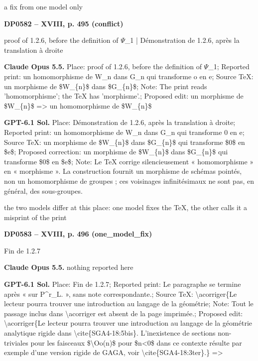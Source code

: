 a fix from one model only\par
\par\noindent\hypertarget{DP0582}{}\textbf{DP0582 -- XVIII, p. 495 (conflict)}\par
proof of 1.2.6, before the definition of \ensuremath{\Psi}\_1 | Démonstration de 1.2.6, après la translation à droite\par
\textbf{Claude Opus 5.5.} Place: proof of 1.2.6, before the definition of \ensuremath{\Psi}\_1; Reported print: un homomorphisme de W\_n dans G\_n qui transforme o en e; Source TeX: un morphisme de \$W\_\{n\}\$ dans \$G\_\{n\}\$; Note: The print reads 'homomorphisme'; the TeX has 'morphisme'.; Proposed edit: un morphisme de \$W\_\{n\}\$ =\allowbreak > un homomorphisme de \$W\_\{n\}\$\par
\textbf{GPT-6.1 Sol.} Place: Démonstration de 1.2.6, après la translation à droite; Reported print: un homomorphisme de W\_n dans G\_n qui transforme 0 en e; Source TeX: un morphisme de \$W\_\{n\}\$ dans \$G\_\{n\}\$ qui transforme \$0\$ en \$e\$; Proposed correction: un morphisme de \$W\_\{n\}\$ dans \$G\_\{n\}\$ qui transforme \$0\$ en \$e\$; Note: Le TeX corrige silencieusement « homomorphisme » en « morphisme ». La construction fournit un morphisme de schémas pointés, non un homomorphisme de groupes ; ces voisinages infinitésimaux ne sont pas, en général, des sous-groupes.\par
the two models differ at this place: one model fixes the TeX, the other calls it a misprint of the print\par
\par\noindent\hypertarget{DP0583}{}\textbf{DP0583 -- XVIII, p. 496 (one\_model\_fix)}\par
Fin de 1.2.7\par
\textbf{Claude Opus 5.5.} nothing reported here\par
\textbf{GPT-6.1 Sol.} Place: Fin de 1.2.7; Reported print: Le paragraphe se termine après « sur P\textasciicircum{}r\_L. », sans note correspondante.; Source TeX: \textbackslash{}acorriger\{Le lecteur pourra trouver une introduction au langage de la géométrie; Note: Tout le passage inclus dans \textbackslash{}acorriger est absent de la page imprimée.; Proposed edit: \textbackslash{}acorriger\{Le lecteur pourra trouver une introduction au langage de la géométrie analytique rigide dans \textbackslash{}cite\{SGA4-18:5bis\}. L'inexistence de sections non-triviales pour les faisceaux \$\textbackslash{}Oo(n)\$ pour \$n<0\$ dans ce contexte résulte par exemple d'une version rigide de GAGA, voir \textbackslash{}cite\{SGA4-18:3ter\}.\} =\allowbreak > \par
